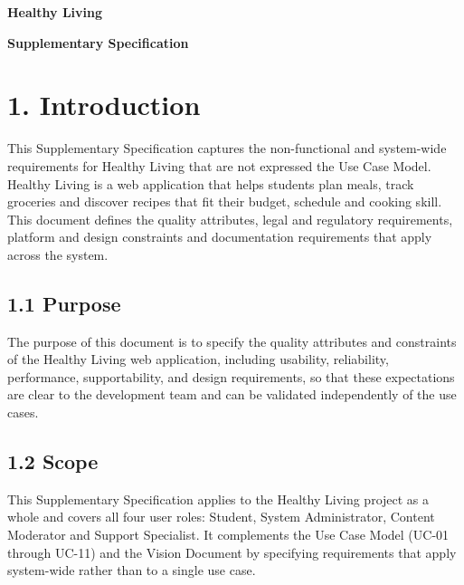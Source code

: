 \documentclass[10pt,letterpaper]{article}
\begin{document}
\begin{center}
{\fontsize{24}{28}\selectfont \textbf{Healthy Living}}
\end{center}
\vspace{0.5em}

\begin{center}
{\fontsize{14}{16}\selectfont \textbf{Supplementary Specification}}
\end{center}
\vspace{1em}

\section*{1. Introduction}

This Supplementary Specification captures the non-functional and system-wide requirements for Healthy Living that are not expressed the Use Case Model. Healthy Living is a web application that helps students plan meals, track groceries and discover recipes that fit their budget, schedule and cooking skill. This document defines the quality attributes, legal and regulatory requirements, platform and design constraints and documentation requirements that apply across the system.

\subsection*{1.1 Purpose}
The purpose of this document is to specify the quality attributes and constraints of the Healthy Living web application, including usability, reliability, performance, supportability, and design requirements, so that these expectations are clear to the development team and can be validated independently of the use cases.

\subsection*{1.2 Scope}
This Supplementary Specification applies to the Healthy Living project as a whole and covers all four user roles: Student, System Administrator, Content Moderator and Support Specialist. It complements the Use Case Model (UC-01 through UC-11) and the Vision Document by specifying requirements that apply system-wide rather than to a single use case.
\end{document}
